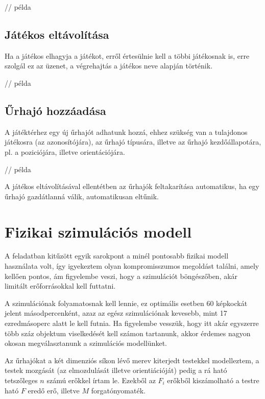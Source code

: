 \begin{itemize}
\begin{js}
  // példa
\end{js}

\subsection{Játékos eltávolítása}

Ha a játékos elhagyja a játékot, erről értesülnie kell a többi játékosnak is, erre szolgál ez az üzenet, a végrehajtás a játékos neve alapján történik.

\begin{js}
  // példa
\end{js}

\subsection{Űrhajó hozzáadása}

A játéktérhez egy új űrhajót adhatunk hozzá, ehhez szükség van a tulajdonos játékosra (az azonosítójára), az űrhajó típusára, illetve az űrhajó kezdőállapotára, pl. a poziciójára, illetve orientációjára.

\begin{js}
  // példa
\end{js}

A játékos eltávolításával ellentétben az űrhajók feltakarítása automatikus, ha egy űrhajó gazdátlanná válik, automatikusan eltűnik.

\section{Fizikai szimulációs modell}

A feladatban kitűzött egyik sarokpont a minél pontosabb fizikai modell
használata volt, így igyekeztem olyan kompromisszumos megoldást találni, amely
kellően pontos, ám figyelembe veszi, hogy a szimulációt böngészőben, akár
limitált erőforrásokkal kell futtatni.

A szimulációnak folyamatosnak kell lennie, ez optimális esetben 60 képkockát
jelent másodpercenként, azaz az egész szimulációnak kevesebb, mint 17
ezredmásoperc alatt le kell futnia.  Ha figyelembe vesszük, hogy itt akár
egyszerre több száz objektum viselkedését kell számon tartanunk, akkor érdemes
nagyon okosan megválasztanunk a szimulációs modellünket.

Az űrhajókat a két dimenziós síkon lévő merev kiterjedt testekkel modelleztem, a
testek mozgását (az elmozdulását illetve orientiációját) pedig a rá ható
tetszőleges $n$ számú erőkkel írtam le. Ezekből az $F_i$ erőkből kiszámolható a
testre ható $F$ eredő erő, illetve $M$ forgatónyomaték.


\end{itemize}
